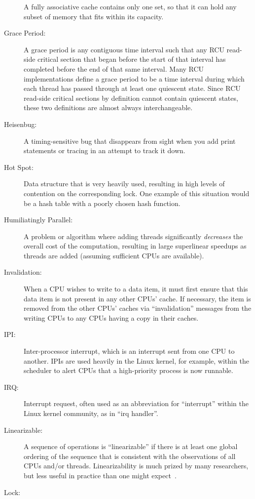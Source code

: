 \begin{description}
	A fully associative cache contains only
	one set, so that it can hold any subset of
	memory that fits within its capacity.
	\fi
\item[Grace Period:]
	A grace period is any contiguous time interval such that
	any RCU read-side critical section that began before the
	start of that interval has
	completed before the end of that same interval.
	Many RCU implementations define a grace period to be a
	time interval during which each thread has passed through at
	least one quiescent state.
	Since RCU read-side critical sections by definition cannot
	contain quiescent states, these two definitions are almost
	always interchangeable.
\item[Heisenbug:]
	A timing-sensitive bug that disappears from sight when you
	add print statements or tracing in an attempt to track it
	down.
\item[Hot Spot:]
	Data structure that is very heavily used, resulting in high
	levels of contention on the corresponding lock.
	One example of this situation would be a hash table with
	a poorly chosen hash function.
\item[Humiliatingly Parallel:]
	A problem or algorithm where adding threads significantly
	\emph{decreases} the overall cost of the computation, resulting in
	large superlinear speedups as threads are added (assuming sufficient
	CPUs are available).
\item[Invalidation:]
	When a CPU wishes to write to a data item, it must first ensure
	that this data item is not present in any other CPUs' cache.
	If necessary, the item is removed from the other CPUs' caches
	via ``invalidation'' messages from the writing CPUs to any
	CPUs having a copy in their caches.
\item[IPI:]
	Inter-processor interrupt, which is an
	interrupt sent from one CPU to another.
	IPIs are used heavily in the Linux kernel, for example, within
	the scheduler to alert CPUs that a high-priority process is now
	runnable.
\item[IRQ:]
	Interrupt request, often used as an abbreviation for ``interrupt''
	within the Linux kernel community, as in ``irq handler''.
\item[Linearizable:]
	A sequence of operations is ``linearizable'' if there is at
	least one global ordering of the sequence that is consistent
	with the observations of all CPUs and/or threads.
	Linearizability is much prized by many researchers, but less
	useful in practice than one might
	expect~\cite{AndreasHaas2012FIFOisnt}.
\item[Lock:]

\end{description}
